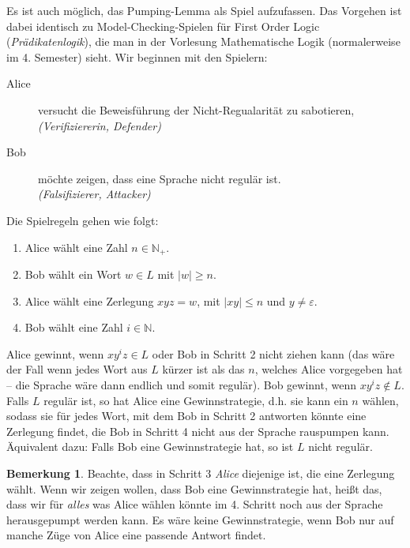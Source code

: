 \documentclass[11pt, a4paper]{article}
\theoremstyle{definition}
\newtheorem*{remark*}{Bemerkung}
\theoremstyle{plain}
\numberwithin{equation}{section}
\begin{document}
Es ist auch möglich, das Pumping-Lemma als Spiel aufzufassen. Das Vorgehen ist dabei identisch zu Model-Checking-Spielen für First Order Logic (\textit{Prädikatenlogik}), die man in der Vorlesung Mathematische Logik (normalerweise im 4. Semester) sieht. Wir beginnen mit den Spielern:
\begin{description}
	\item[Alice] versucht die Beweisführung der Nicht-Regualarität zu sabotieren,\\
		\textit{(Verifiziererin, Defender)}
	\item[Bob] möchte zeigen, dass eine Sprache nicht regulär ist.\\
		\textit{(Falsifizierer, Attacker)}
\end{description}
Die Spielregeln gehen wie folgt:
\begin{enumerate}[label=\arabic*)]
	\item Alice wählt eine Zahl $n \in \mathbb{N}_+$.
	\item Bob wählt ein Wort $w \in L$ mit $|w| \geq n$.
	\item Alice wählt eine Zerlegung $xyz = w$, mit $|xy| \leq n$ und $y \neq \varepsilon$.
	\item Bob wählt eine Zahl $i \in \mathbb{N}$.
\end{enumerate}
Alice gewinnt, wenn $xy^iz \in L$ oder Bob in Schritt 2 nicht ziehen kann (das wäre der Fall wenn jedes Wort aus $L$ kürzer ist als das $n$, welches Alice vorgegeben hat -- die Sprache wäre dann endlich und somit regulär). Bob gewinnt, wenn $xy^iz \notin L$.\\
Falls $L$ regulär ist, so hat Alice eine Gewinnstrategie, d.h. sie kann ein $n$ wählen, sodass sie für jedes Wort, mit dem Bob in Schritt 2 antworten könnte eine Zerlegung findet, die Bob in Schritt 4 nicht aus der Sprache rauspumpen kann. Äquivalent dazu: Falls Bob eine Gewinnstrategie hat, so ist $L$ nicht regulär.
\begin{remark*}
	Beachte, dass in Schritt 3 \textit{Alice} diejenige ist, die eine Zerlegung wählt. Wenn wir zeigen wollen, dass Bob eine Gewinnstrategie hat, heißt das, dass wir für \textit{alles} was Alice wählen könnte im 4. Schritt noch aus der Sprache herausgepumpt werden kann. Es wäre keine Gewinnstrategie, wenn Bob nur auf manche Züge von Alice eine passende Antwort findet.
\end{remark*}
\end{document}
